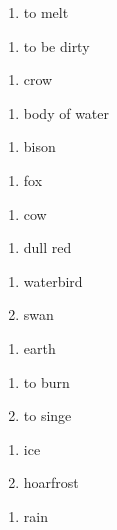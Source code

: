 \begin{enumerate}
\item to melt
\end{enumerate}
\begin{enumerate}
\item to be dirty
\end{enumerate}
\begin{enumerate}
\item crow
\end{enumerate}
\begin{enumerate}
\item body of water
\end{enumerate}
\begin{enumerate}
\item bison
\end{enumerate}
\begin{enumerate}
\item fox
\end{enumerate}
\begin{enumerate}
\item cow
\end{enumerate}
\begin{enumerate}
\item dull red
\end{enumerate}
\begin{enumerate}
\item waterbird
\item swan
\end{enumerate}
\begin{enumerate}
\item earth
\end{enumerate}
\begin{enumerate}
\item to burn
\item to singe
\end{enumerate}
\begin{enumerate}
\item ice
\item hoarfrost
\end{enumerate}
\begin{enumerate}
\item rain
\end{enumerate}
